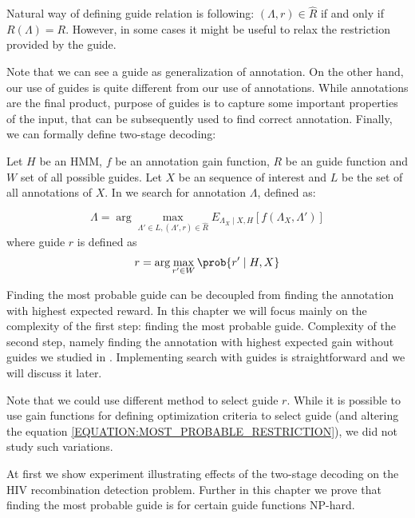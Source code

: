 Natural way of defining guide relation is following: $(\Lambda, r)\in \hat{R}$
if and only if $R(\Lambda)=R$. However, in some cases it might be useful
to relax the restriction provided by the guide. 

Note that we can see a guide as generalization of annotation. On the other hand,
our use of guides is quite different from our use of annotations. While
annotations are the final product, purpose of guides is to capture some
important properties of the input, that can be subsequently used to find correct
annotation. Finally, we can formally define two-stage decoding:

\begin{definition}
Let $H$ be an HMM, $f$ be an annotation gain function, $R$ be an guide 
function and $W$ set of all possible guides. Let $X$ be an sequence of
interest and $L$ be the set of all annotations of $X$. In  we search for annotation $\Lambda$, defined as:

\begin{equation}
\Lambda = \arg\max_{\Lambda'\in L, (\Lambda', r)\in \hat{R}}E_{\Lambda_X\mid
X,H}[f(\Lambda_X,\Lambda')]\label{EQUATION:HIGHEST_EXPECTED_RESTRICTED_REWARD}
\end{equation}
where guide $r$ is defined as
\begin{equation}
r = \arg\max_{r'\in W}\prob{r'\mid H, X}
\label{EQUATION:MOST_PROBABLE_RESTRICTION}
\end{equation}
\end{definition}

Finding the most probable guide can be decoupled from finding the
annotation with highest expected reward. In this chapter we will focus
mainly on the complexity of the first step: finding the most
probable guide. Complexity of the second step, namely finding the annotation
with highest expected gain without guides we studied in \cite{Nanasi2010mgr,
Nanasi2010}. Implementing search with guides is straightforward and we will
discuss it later.

Note that we could use different method to select guide $r$. While it is
possible to use gain functions for defining optimization criteria to select
guide (and altering the equation \ref{EQUATION:MOST_PROBABLE_RESTRICTION}), 
we did not study such variations.

At first we show experiment illustrating effects of the two-stage decoding on
the HIV recombination detection problem.  Further in this chapter we prove that
finding the most probable guide is for certain guide functions NP-hard.

